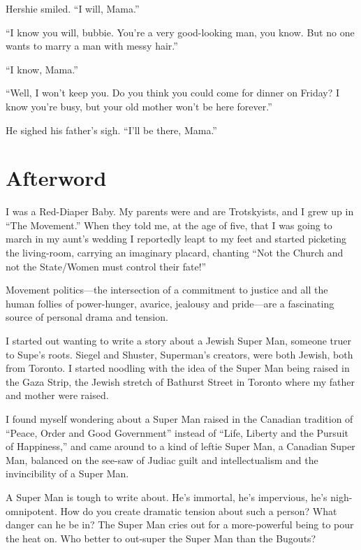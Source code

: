 Hershie smiled. ``I will, Mama.''

``I know you will, bubbie. You're a very good-looking man, you know. But no one 
wants to marry a man with messy hair.''

``I know, Mama.''

``Well, I won't keep you. Do you think you could come for dinner on Friday? I 
know you're busy, but your old mother won't be here forever.''

He sighed his father's sigh. ``I'll be there, Mama.''

\section{Afterword}
I was a Red-Diaper Baby. My parents were and are Trotskyists, and I grew
up in ``The Movement.'' When they told me, at the age of five, that I was
going to march in my aunt's wedding I reportedly leapt to my feet and
started picketing the living-room, carrying an imaginary placard, 
chanting ``Not the Church and not the State/Women must control their fate!''

Movement politics---the intersection of a commitment to justice and all
the human follies of power-hunger, avarice, jealousy and pride---are a
fascinating source of personal drama and tension.

I started out wanting to write a story about a Jewish Super Man,
someone truer to Supe's roots. Siegel and Shuster, Superman's creators,
were both Jewish, both from Toronto. I started noodling with the idea
of the Super Man being raised in the Gaza Strip, the Jewish stretch of
Bathurst Street in Toronto where my father and mother were raised.

I found myself wondering about a Super Man raised in the Canadian
tradition of ``Peace, Order and Good Government'' instead of ``Life,
Liberty and the Pursuit of Happiness,'' and came around to a kind
of leftie Super Man, a Canadian Super Man, balanced on the see-saw of
Judiac guilt and intellectualism and the invincibility of a Super Man.

A Super Man is tough to write about. He's immortal, he's impervious, he's
nigh-omnipotent. How do you create dramatic tension about such a person?
What danger can he be in? The Super Man cries out for a more-powerful
being to pour the heat on. Who better to out-super the Super Man than
the Bugouts?


